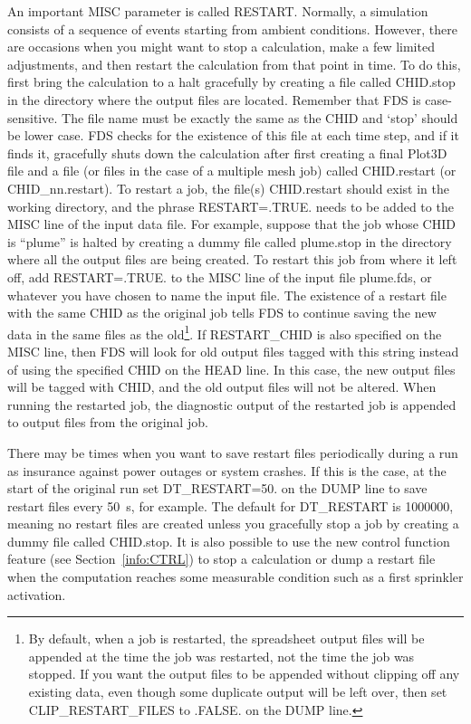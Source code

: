 \documentclass[11pt]{book}
\begin{document}
An important {\ct MISC} parameter is called {\ct RESTART}. Normally, a simulation consists of a sequence of events starting from ambient conditions. However, there are occasions when you might want to stop a calculation, make a few limited adjustments, and then restart the calculation from that point in time. To do this, first bring the calculation to a halt gracefully by creating a file called {\ct CHID.stop} in the directory where the output files are located. Remember that FDS is case-sensitive. The file name must be exactly the same as the {\ct CHID} and `stop' should be lower case. FDS checks for the existence of this file at each time step, and if it finds it, gracefully shuts down the calculation after first creating a final Plot3D file and a file (or files in the case of a multiple mesh job) called {\ct CHID.restart} (or {\ct CHID\_nn.restart}). To restart a job, the file(s) {\ct CHID.restart} should exist in the working directory, and the phrase {\ct RESTART=.TRUE.} needs to be added to the {\ct MISC} line of the input data file. For example, suppose that the job whose {\ct CHID} is ``plume'' is halted by creating a dummy file called {\ct plume.stop} in the directory where all the output files are being created. To restart this job from where it left off, add {\ct RESTART=.TRUE.} to the {\ct MISC} line of the input file {\ct plume.fds}, or whatever you have chosen to name the input file. The existence of a restart file with the same {\ct CHID} as the original job tells FDS to continue saving the new data in the same files as the old\footnote{By default, when a job is restarted, the spreadsheet output files will be appended at the time the job was restarted, not the time the job was stopped. If you want the output files to be appended without clipping off any existing data, even though some duplicate output will be left over, then set {\ct CLIP\_RESTART\_FILES} to {\ct .FALSE.} on the {\ct DUMP} line.}.  If {\ct RESTART\_CHID} is also specified on the {\ct MISC} line, then FDS will look for old output files tagged with this string instead of using the specified {\ct CHID} on the {\ct HEAD} line. In this case, the new output files will be tagged with {\ct CHID}, and the old output files will not be altered. When running the restarted job, the diagnostic output of the restarted job is appended to output files from the original job.

There may be times when you want to save restart files periodically during a run as insurance against power outages or system crashes. If this is the case, at the start of the original run set {\ct DT\_RESTART=50.} on the {\ct DUMP} line to save restart files every 50~s, for example. The default for {\ct DT\_RESTART} is 1000000, meaning no restart files are created unless you gracefully stop a job by creating a dummy file called {\ct CHID.stop}.
It is also possible to use the new control function feature (see Section~\ref{info:CTRL}) to stop a calculation or dump a restart file when the computation reaches some measurable condition such as a first sprinkler activation.
\end{document}
